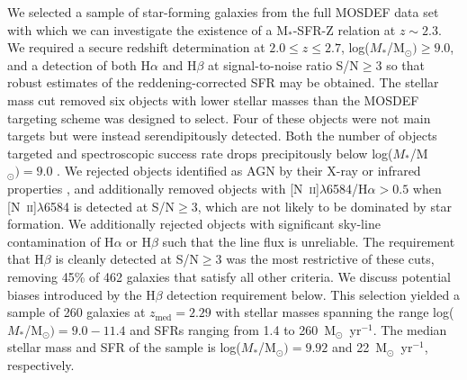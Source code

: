 \documentclass[iop,twocolappendix]{emulateapj}
\newcommand{\mstar}{$\mbox{M}_*$}
\newcommand{\ii}{~\textsc{ii}}
\begin{document}
We selected a sample of star-forming galaxies from the full MOSDEF data set with which we
 can investigate the existence of a \mstar-SFR-Z relation at $z\sim2.3$.
  We required a secure redshift determination
 at $2.0\leq z\leq2.7$, log($M_*$/M$_{\odot})\geq9.0$, and a detection of both H$\alpha$ and H$\beta$ at
 signal-to-noise ratio S/N$\geq$3 so that robust estimates of the reddening-corrected SFR may be obtained.
  The stellar mass cut removed six objects with lower stellar masses than the MOSDEF targeting scheme was
 designed to select.  Four of these objects were not main targets but were instead serendipitously detected.
  Both the number of objects targeted and spectroscopic success rate drops precipitously below
 log($M_*$/M$_{\odot})=9.0$ \citep{kri15}.  
  We rejected objects identified
 as AGN by their X-ray or infrared properties \citep{coi15,aza17}, and additionally removed objects
 with [N\ii]$\lambda$6584/H$\alpha>0.5$ when [N\ii]$\lambda$6584 is detected at S/N$\geq$3, which
 are not likely to be dominated by star formation.
  We additionally rejected objects with significant sky-line contamination of H$\alpha$ or
 H$\beta$ such that the line flux is unreliable.
  The requirement that H$\beta$ is cleanly detected at S/N$\geq$3 was the most restrictive of these cuts, removing
 45\% of 462 galaxies that satisfy all other criteria.  We discuss potential biases introduced by the H$\beta$
 detection requirement below.
  This selection yielded a sample of
 260 galaxies at $z_{\text{med}}=2.29$ with stellar masses spanning the range
 log($M_*$/M$_{\odot})=9.0-11.4$ and SFRs ranging from 1.4 to 260~M$_{\odot}$~yr$^{-1}$.
  The median stellar mass and SFR of the sample is log($M_*$/M$_{\odot})=9.92$ and
 22~M$_{\odot}$~yr$^{-1}$, respectively.
\end{document}
